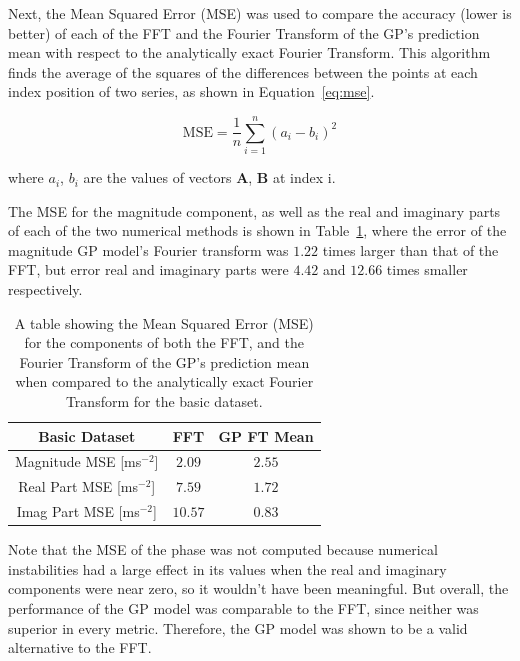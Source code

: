 \documentclass[12pt]{article}
\begin{document}
    Next, the Mean Squared Error (MSE) was used to compare the accuracy (lower is better) of each of the FFT and the Fourier Transform of the GP's prediction mean with respect to the analytically exact Fourier Transform.
    This algorithm finds the average of the squares of the differences between the points at each index position of two series, as shown in Equation~\ref{eq:mse}.

    \begin{equation}
        \text{MSE} = \frac{1}{n} \sum_{i=1}^{n} (a_i - b_i)^2 \label{eq:mse}
    \end{equation}

    \noindent where $a_i$, $b_i$ are the values of vectors $\mathbf{A}$, $\mathbf{B}$ at index i.

    The MSE for the magnitude component, as well as the real and imaginary parts of each of the two numerical methods is shown in Table~\ref{tab:basic-mse}, where the error of the magnitude GP model's Fourier transform was $1.22$ times larger than that of the FFT, but error real and imaginary parts were $4.42$ and $12.66$ times smaller respectively.

    \begin{table}[H]
        \centering %
        \setlength{\arrayrulewidth}{1pt} %
        \begin{tabular}{|c|c|c|} %
            \hline
            Basic Dataset & FFT & GP FT Mean \\ %
            \hline
            Magnitude MSE [ms$^{-2}$] & $2.09$ & $2.55$ \\
            \hline
            Real Part MSE [ms$^{-2}$] & $7.59$ & $1.72$ \\
            \hline
            Imag Part MSE [ms$^{-2}$] & $10.57$ & $0.83$ \\
            \hline
        \end{tabular}
        \caption{A table showing the Mean Squared Error (MSE) for the components of both the FFT, and the Fourier Transform of the GP's prediction mean when compared to the analytically exact Fourier Transform for the basic dataset.}
        \label{tab:basic-mse}
    \end{table}

    Note that the MSE of the phase was not computed because numerical instabilities had a large effect in its values when the real and imaginary components were near zero, so it wouldn't have been meaningful.
    But overall, the performance of the GP model was comparable to the FFT, since neither was superior in every metric.
    Therefore, the GP model was shown to be a valid alternative to the FFT\@.
\end{document}
